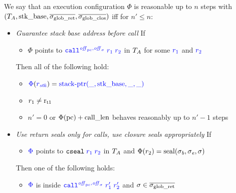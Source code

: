 \documentclass[a4paper]{article}
\begin{document}
\begin{definition}
  \label{def:reasonable-conf}
  We say that an execution configuration $\Phi$ is reasonable up to $n$ steps with $(T_{A},\mathrm{stk\_base},\overline{\sigma_{\mathrm{glob\_ret}}},\overline{\sigma_{\mathrm{glob\_clos}}})$ 
  iff for $n' \leq n$:
  \begin{itemize}
  \item \emph{Guarantee stack base address before call} If
    \begin{itemize}
    \item $\Phi$ points to $\src{\scall{\offpc,\offsigma}{r_1}{r_2}}$ in $T_{A}$
      for some ${\color{blue} r_1}$ and ${\color{blue} r_2}$
    \end{itemize}
    Then all of the following hold:
    \begin{itemize}
    \item ${\color{blue} \Phi}({\color{blue} r_{\mathit{stk}}}) =
      {\color{blue} \mathrm{stack\text{-}ptr}(\_,\mathrm{stk\_base},\_,\_)}$
    \item $r_1 \neq \mathrm{r}_\mathrm{t1}$
    \item $n' = 0$ or $\Phi(\mathrm{pc}) + \mathrm{call\_len}$ behaves reasonably up to $n'-1$ steps
    \end{itemize}
  \item \emph{Use return seals only for calls, use closure seals appropriately} If
    \begin{itemize}
    \item ${\color{blue} \Phi}$ points to $\src{\tcseal{r_1}{r_2}}$ in $T_{A}$ and $\Phi(r_2) = \mathrm{seal}(\sigma_{\mathit{b}},\sigma_{\mathit{e}},\sigma)$
    \end{itemize}
    Then one of the following holds:
    \begin{itemize}
    \item ${\color{blue} \Phi}$ is inside $\src{\scall{\offpc,\offsigma}{r_1'}{r_2'}}$ and $\sigma \in \overline{\sigma_{\mathrm{glob\_ret}}}$


\end{itemize}
\end{itemize}
\end{definition}
\end{document}
